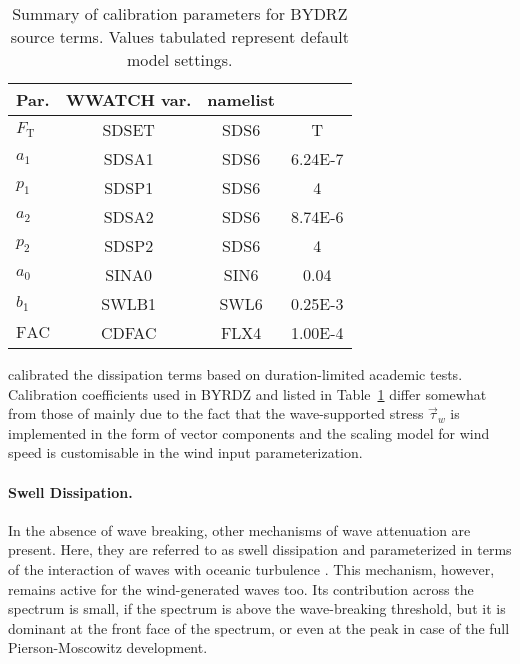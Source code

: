 \begin{table} \begin{center}
\begin{tabular}{|l|c|c|c|} \hline \hline
Par.         &  WWATCH var. & namelist &                  \\
\hline
  $F_{\mathrm{T}}$ &  SDSET       & SDS6     &  T         \\
  $a_1$            &  SDSA1       & SDS6     & 6.24E-7    \\
  $p_1$            &  SDSP1       & SDS6     &  4         \\
  $a_2$            &  SDSA2       & SDS6     & 8.74E-6    \\
  $p_2$            &  SDSP2       & SDS6     &  4         \\
\hline
  $a_0$            &  SINA0       & SIN6     & 0.04       \\
  $b_1$            &  SWLB1       & SWL6     & 0.25E-3    \\
  $\mathrm{FAC}$   &  CDFAC       & FLX4     & 1.00E-4    \\
 \hline \hline
\end{tabular} \end{center}
\caption{Summary of calibration parameters for BYDRZ source terms.
         Values tabulated represent default model settings.}
\label{tab:ST601} \botline \end{table}

\citet{art:RBW12} calibrated the dissipation terms based on duration-limited
academic tests. Calibration coefficients used in BYRDZ and listed in
Table~\ref{tab:ST601} differ somewhat from those of \citet{art:RBW12}
mainly due to the fact that the wave-supported stress $\vec{\tau}_w$
is implemented in the form of vector components and the scaling model
for wind speed is customisable in the wind input parameterization.

\paragraph{Swell Dissipation.} In the absence of wave breaking,
other mechanisms of wave attenuation are present. Here, they are
referred to as swell dissipation and parameterized in terms of
the interaction of waves with oceanic turbulence \citep{bk:Bab11}.
This mechanism, however, remains active for the wind-generated
waves too. Its contribution across the spectrum is small, if the
spectrum is above the wave-breaking threshold, but it is dominant
at the front face of the spectrum, or even at the peak in case of
the full Pierson-Moscowitz development. 

